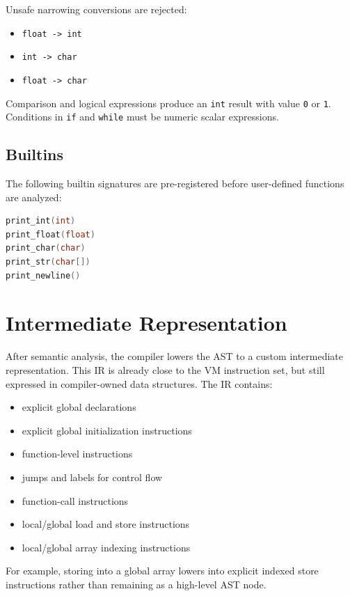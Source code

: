 \documentclass[11pt,a4paper]{article}
\begin{document}
Unsafe narrowing conversions are rejected:

\begin{itemize}[leftmargin=2em]
    \item \texttt{float -> int}
    \item \texttt{int -> char}
    \item \texttt{float -> char}
\end{itemize}

Comparison and logical expressions produce an \texttt{int} result with value
\texttt{0} or \texttt{1}. Conditions in \texttt{if} and \texttt{while} must be
numeric scalar expressions.

\subsection*{Builtins}

The following builtin signatures are pre-registered before user-defined
functions are analyzed:

\begin{lstlisting}[language=C]
print_int(int)
print_float(float)
print_char(char)
print_str(char[])
print_newline()
\end{lstlisting}

\section{Intermediate Representation}

After semantic analysis, the compiler lowers the AST to a custom intermediate
representation. This IR is already close to the VM instruction set, but still
expressed in compiler-owned data structures. The IR contains:

\begin{itemize}[leftmargin=2em]
    \item explicit global declarations
    \item explicit global initialization instructions
    \item function-level instructions
    \item jumps and labels for control flow
    \item function-call instructions
    \item local/global load and store instructions
    \item local/global array indexing instructions
\end{itemize}

For example, storing into a global array lowers into explicit indexed store
instructions rather than remaining as a high-level AST node.
\end{document}
